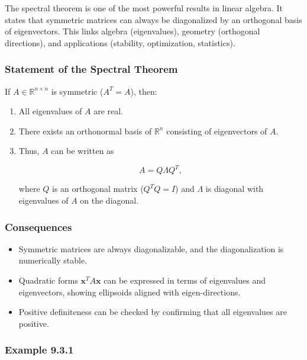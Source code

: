 \documentclass[
  12pt,
  a4paper,
]{article}
\begin{document}
The spectral theorem is one of the most powerful results in linear
algebra. It states that symmetric matrices can always be diagonalized by
an orthogonal basis of eigenvectors. This links algebra (eigenvalues),
geometry (orthogonal directions), and applications (stability,
optimization, statistics).

\subsubsection{Statement of the Spectral
Theorem}\label{statement-of-the-spectral-theorem}

If \(A \in \mathbb{R}^{n \times n}\) is symmetric (\(A^T = A\)), then:

\begin{enumerate}
\def\labelenumi{\arabic{enumi}.}
\item
  All eigenvalues of \(A\) are real.
\item
  There exists an orthonormal basis of \(\mathbb{R}^n\) consisting of
  eigenvectors of \(A\).
\item
  Thus, \(A\) can be written as

  \[A = Q \Lambda Q^T,\]

  where \(Q\) is an orthogonal matrix (\(Q^T Q = I\)) and \(\Lambda\) is
  diagonal with eigenvalues of \(A\) on the diagonal.
\end{enumerate}

\subsubsection{Consequences}\label{consequences}

\begin{itemize}
\item
  Symmetric matrices are always diagonalizable, and the diagonalization
  is numerically stable.
\item
  Quadratic forms \(\mathbf{x}^T A \mathbf{x}\) can be expressed in
  terms of eigenvalues and eigenvectors, showing ellipsoids aligned with
  eigen-directions.
\item
  Positive definiteness can be checked by confirming that all
  eigenvalues are positive.
\end{itemize}

\subsubsection{Example 9.3.1}\label{example-931}
\end{document}
